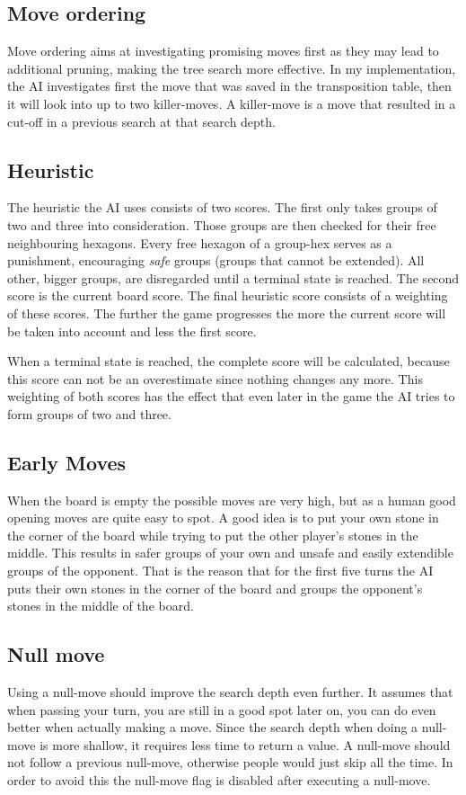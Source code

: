 \documentclass[a4paper]{article}
\begin{document}
\subsection{Move ordering}
Move ordering aims at investigating promising moves first as they may lead to additional pruning, making the tree search more effective.
In my implementation, the AI investigates first the move that was saved in the transposition table, then it will look into up to two killer-moves. A killer-move is a move that resulted in a cut-off in a previous search at that search depth.

\subsection{Heuristic}
The heuristic the AI uses consists of two scores. The first only takes groups of two and three into consideration. Those groups are then checked for their free neighbouring hexagons. Every free hexagon of a group-hex serves as a punishment, encouraging \textit{safe} groups (groups that cannot be extended). All other, bigger groups, are disregarded until a terminal state is reached. The second score is the current board score. The final heuristic score consists of a weighting of these scores. The further the game progresses the more the current score will be taken into account and less the first score.

When a terminal state is reached, the complete score will be calculated, because this score can not be an overestimate since nothing changes any more. This weighting of both scores has the effect that even later in the game the AI tries to form groups of two and three.

\subsection{Early Moves}
When the board is empty the possible moves are very high, but as a human good opening moves are quite easy to spot. A good idea is to put your own stone in the corner of the board while trying to put the other player's stones in the middle. This results in safer groups of your own and unsafe and easily extendible groups of the opponent.
That is the reason that for the first five turns the AI puts their own stones in the corner of the board and groups the opponent's stones in the middle of the board.

\subsection{Null move}
Using a null-move should improve the search depth even further. It assumes that when passing your turn, you are still in a good spot later on, you can do even better when actually making a move. Since the search depth when doing a null-move is more shallow, it requires less time to return a value. A null-move should not follow a previous null-move, otherwise people would just skip all the time. In order to avoid this the null-move flag is disabled after executing a null-move.
\end{document}
